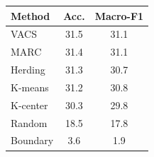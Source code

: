 \begin{tabular}{lcc}
\toprule
Method & Acc. & Macro-F1 \\
\midrule
VACS & 31.5 & 31.1 \\
MARC & 31.4 & 31.1 \\
Herding & 31.3 & 30.7 \\
K-means & 31.2 & 30.8 \\
K-center & 30.3 & 29.8 \\
Random & 18.5 & 17.8 \\
Boundary & 3.6 & 1.9 \\
\bottomrule
\end{tabular}
